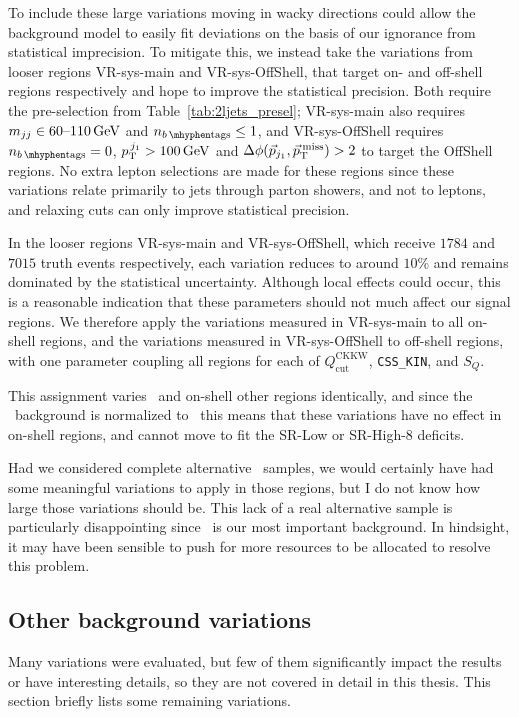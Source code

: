 To include these large variations moving in wacky directions could allow the
background model to easily fit deviations on the basis of our ignorance
from statistical imprecision.
To mitigate this, we instead take the variations from looser regions
VR-sys-main and VR-sys-OffShell, that target on- and off-shell regions
respectively and hope to improve the statistical precision.
Both require the pre-selection from Table~\ref{tab:2ljets_presel};
VR-sys-main also requires
$\mjj \in 60\textrm{--}110\,\eV[G]$ and $\nbtag \leq 1$,
and VR-sys-OffShell requires
$\nbtag = 0$, $\ptjone > 100\,\eV[G]$ and $\dphijmet > 2$ to target the
OffShell regions.
No extra lepton selections are made for these regions since these variations
relate primarily to jets through parton showers, and not to leptons, and
relaxing cuts can only improve statistical precision.

In the looser regions VR-sys-main and VR-sys-OffShell,
which receive $1784$ and $7015$ truth events respectively, each variation
reduces to around $10\%$ and remains dominated by the statistical uncertainty.
Although local effects could occur, this is a reasonable indication that these
parameters should not much affect our signal regions.
We therefore apply the variations measured in VR-sys-main to all on-shell
regions,
and the variations measured in VR-sys-OffShell to off-shell regions,
with one parameter coupling all regions for each of
$Q_\textrm{cut}^\textrm{CKKW}$,
\texttt{CSS\_KIN}, and
$S_Q$.

This assignment varies \crvz\ and on-shell other regions identically,
and since the \diboson\ background is normalized to \crvz\ this means that
these variations have no effect in on-shell regions, and cannot move to
fit the SR-Low or SR-High-8 deficits.

Had we considered complete alternative \diboson\ samples, we would certainly
have had some meaningful variations to apply in those regions, but I do not
know how large those variations should be.
This lack of a real alternative sample is particularly disappointing since
\diboson\ is our most important background.
In hindsight, it may have been sensible to push for more resources to be
allocated to resolve this problem.

\subsection{Other background variations}
\label{sec:2ljets_other_background_variations}
Many variations were evaluated, but few of them significantly impact the
results or have interesting details, so they are not covered in detail in
this thesis.
This section briefly lists some remaining variations.

